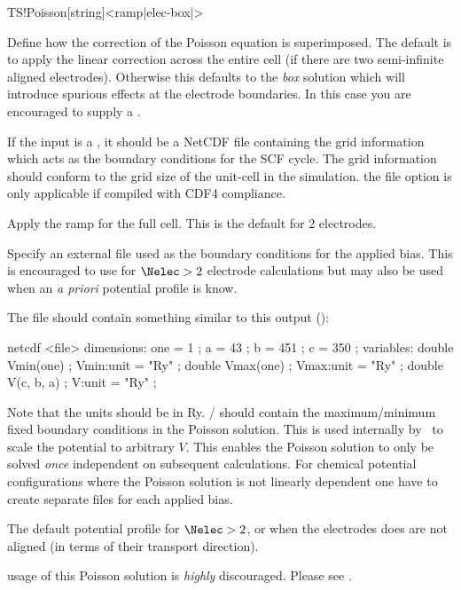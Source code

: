 \begin{fdfentry}{TS!Poisson}[string]<ramp|elec-box|>

  Define how the correction of the Poisson equation is
  superimposed. The default is to apply the linear correction across
  the entire cell (if there are two semi-infinite aligned
  electrodes). Otherwise this defaults to the \emph{box} solution
  which will introduce spurious effects at the electrode
  boundaries. In this case you are encouraged to supply a .

  If the input is a , it should be a NetCDF file containing
  the grid information which acts as the boundary conditions for the
  SCF cycle.
  The grid information should conform to the grid size of the
  unit-cell in the simulation.
  \note the file option is only applicable if compiled with CDF4
  compliance.

  \begin{fdfoptions}
    \option[ramp]%

    Apply the ramp for the full cell. This is the default for 2
    electrodes.

    \option[<file>]%

    Specify an external file used as the boundary conditions for the
    applied bias. This is encouraged to use for $\Nelec>2$ electrode
    calculations but may also be used when an \emph{a priori}
    potential profile is know.

    The file should contain something similar to this output
    ():
    \begin{output}[fontsize=\footnotesize]
netcdf <file> {
dimensions:
	one = 1 ;
	a = 43 ;
	b = 451 ;
	c = 350 ;
variables:
	double Vmin(one) ;
		Vmin:unit = "Ry" ;
	double Vmax(one) ;
		Vmax:unit = "Ry" ;
	double V(c, b, a) ;
		V:unit = "Ry" ;
}
    \end{output}
    Note that the units should be in Ry. /
    should contain the maximum/minimum fixed boundary conditions in
    the Poisson solution. This is used internally by \tsiesta\ to
    scale the potential to arbitrary $V$. This enables the Poisson
    solution to only be solved \emph{once} independent on subsequent
    calculations. For chemical potential configurations where the
    Poisson solution is not linearly dependent one have to create
    separate files for each applied bias.



    The default potential profile for $\Nelec>2$, or when the electrodes
    does are not aligned (in terms of their transport direction).
    
    \note usage of this Poisson solution is \emph{highly}
    discouraged. Please see .

  \end{fdfoptions}
  
\end{fdfentry}

